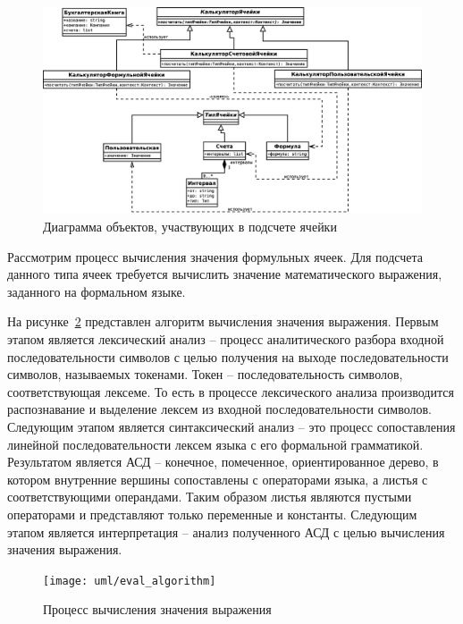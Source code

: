 \documentclass[14pt,a4paper]{reportmod}
\begin{document}
\begin{figure}
  \centering
  \includegraphics[scale=0.4]{uml/_classes_2}
  \caption{Диаграмма объектов, участвующих в подсчете ячейки}
  \label{pic:classes_2}
\end{figure}

Рассмотрим процесс вычисления значения формульных ячеек. Для подсчета данного типа ячеек требуется вычислить значение математического выражения, заданного на формальном языке.

На рисунке~\ref{pic:evalprocess} представлен алгоритм вычисления значения выражения. Первым этапом является лексический анализ -- процесс аналитического разбора входной последовательности символов  с целью получения на выходе последовательности символов, называемых токенами. Токен -- последовательность символов, соответствующая лексеме. То есть в процессе лексического анализа производится распознавание и выделение лексем из входной последовательности символов. Следующим этапом является синтаксический анализ --  это процесс сопоставления линейной последовательности лексем языка с его формальной грамматикой. Результатом является АСД -- конечное, помеченное, ориентированное дерево, в котором внутренние вершины сопоставлены с операторами языка, а листья с соответствующими операндами. Таким образом листья являются пустыми операторами и представляют только переменные и константы. Следующим этапом является интерпретация -- анализ полученного АСД с целью вычисления значения выражения.

\begin{figure}[ht]
  \centering
  \texttt{[image: uml/eval\_algorithm]}
  \caption{Процесс вычисления значения выражения}
  \label{pic:evalprocess}
\end{figure}
\end{document}
